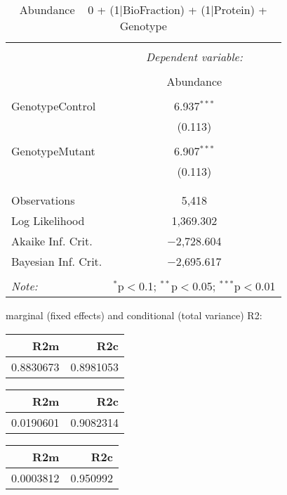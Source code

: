 \documentclass[11pt]{report}
\begin{document}
\begin{table}[!htbp] \centering 
  \caption{Abundance ~ 0 + (1|BioFraction) + (1|Protein) + Genotype} 
  \label{} 
\begin{tabular}{@{\extracolsep{5pt}}lc} 
\\[-1.8ex]\hline 
\hline \\[-1.8ex] 
 & \multicolumn{1}{c}{\textit{Dependent variable:}} \\ 
\cline{2-2} 
\\[-1.8ex] & Abundance \\ 
\hline \\[-1.8ex] 
 GenotypeControl & 6.937$^{***}$ \\ 
  & (0.113) \\ 
  & \\ 
 GenotypeMutant & 6.907$^{***}$ \\ 
  & (0.113) \\ 
  & \\ 
\hline \\[-1.8ex] 
Observations & 5,418 \\ 
Log Likelihood & 1,369.302 \\ 
Akaike Inf. Crit. & $-$2,728.604 \\ 
Bayesian Inf. Crit. & $-$2,695.617 \\ 
\hline 
\hline \\[-1.8ex] 
\textit{Note:}  & \multicolumn{1}{r}{$^{*}$p$<$0.1; $^{**}$p$<$0.05; $^{***}$p$<$0.01} \\ 
\end{tabular} 
\end{table} 
marginal (fixed effects) and conditional (total variance) R2:

\begin{tabular}{r|r}
\hline
R2m & R2c\\
\hline
0.8830673 & 0.8981053\\
\hline
\end{tabular}

\begin{tabular}{r|r}
\hline
R2m & R2c\\
\hline
0.0190601 & 0.9082314\\
\hline
\end{tabular}

\begin{tabular}{r|r}
\hline
R2m & R2c\\
\hline
0.0003812 & 0.950992\\
\hline
\end{tabular}
\end{document}
